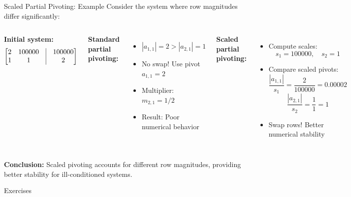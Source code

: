 \documentclass[aspectratio=169]{beamer}
\begin{document}
\begin{frame}{Scaled Partial Pivoting: Example}
	Consider the system where row magnitudes differ significantly:

	\begin{columns}
		\footnotesize{
			\textbf{Initial system:}
			\begin{equation*}
				\begin{bmatrix}
					2 & 100000 & \vline & 100000 \\
					1 & 1      & \vline & 2
				\end{bmatrix}
			\end{equation*}

			\textbf{Standard partial pivoting:}
			\begin{itemize}
				\item $|a_{1,1}| = 2 > |a_{2,1}| = 1$
				\item No swap! Use pivot $a_{1,1} = 2$
				\item Multiplier: $m_{2,1} = 1/2$
				\item Result: Poor numerical behavior
			\end{itemize}}

		\footnotesize{
			\textbf{Scaled partial pivoting:}
			\begin{itemize}
				\item Compute scales:
				      \begin{equation*}
					      s_1 = 100000, \quad s_2 = 1
				      \end{equation*}
				\item Compare scaled pivots:
				      \begin{equation*}
					      \frac{|a_{1,1}|}{s_1} = \frac{2}{100000} = 0.00002
				      \end{equation*}
				      \begin{equation*}
					      \frac{|a_{2,1}|}{s_2} = \frac{1}{1} = 1
				      \end{equation*}
				\item Swap rows! Better numerical stability
			\end{itemize}
		}
	\end{columns}

	\small{\vspace{0.3cm}
		\textbf{Conclusion:} Scaled pivoting accounts for different row magnitudes, providing better stability for ill-conditioned systems.}
\end{frame}

{%
\begin{frame}[standout]
	Exercises
\end{frame}
}
\end{document}
